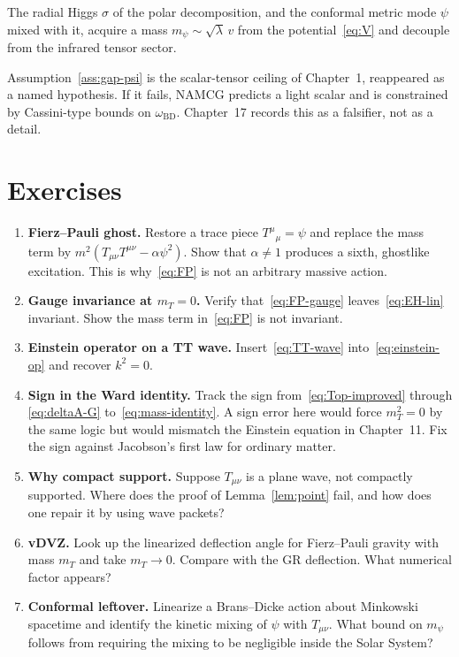 \begin{assumption}
  \label{ass:gap-psi}
  The radial Higgs \(\sigma\) of the polar decomposition, and the
  conformal metric mode \(\psi\) mixed with it, acquire a mass
  \(m_\psi\sim\sqrt{\lambda}\,v\) from the potential~\eqref{eq:V}
  and decouple from the infrared tensor sector.
\end{assumption}

Assumption~\ref{ass:gap-psi} is the scalar-tensor ceiling of
Chapter~1, reappeared as a named hypothesis. If it fails, NAMCG
predicts a light scalar and is constrained by Cassini-type bounds
on \(\omega_{\mathrm{BD}}\). Chapter~17 records this as a
falsifier, not as a detail.

\section{Exercises}
\label{sec:ch7-exercises}

\begin{enumerate}
  \item \textbf{Fierz--Pauli ghost.}
    Restore a trace piece \(T^\mu{}_\mu=\psi\) and replace the mass
    term by \(m^2(T_{\mu\nu}T^{\mu\nu}-\alpha\psi^2)\). Show that
    \(\alpha\neq 1\) produces a sixth, ghostlike excitation.
    This is why~\eqref{eq:FP} is not an arbitrary massive action.
  \item \textbf{Gauge invariance at \(m_T=0\).}
    Verify that~\eqref{eq:FP-gauge} leaves~\eqref{eq:EH-lin}
    invariant. Show the mass term in~\eqref{eq:FP} is not
    invariant.
  \item \textbf{Einstein operator on a TT wave.}
    Insert~\eqref{eq:TT-wave} into~\eqref{eq:einstein-op} and
    recover \(k^2=0\).
  \item \textbf{Sign in the Ward identity.}
    Track the sign from~\eqref{eq:Top-improved} through
    \eqref{eq:deltaA-G} to~\eqref{eq:mass-identity}. A sign error
    here would force \(m_T^2=0\) by the same logic but would
    mismatch the Einstein equation in Chapter~11. Fix the sign
    against Jacobson's first law for ordinary matter.
  \item \textbf{Why compact support.}
    Suppose \(T_{\mu\nu}\) is a plane wave, not compactly supported.
    Where does the proof of Lemma~\ref{lem:point} fail, and how
    does one repair it by using wave packets?
  \item \textbf{vDVZ.}
    Look up the linearized deflection angle for Fierz--Pauli
    gravity with mass \(m_T\) and take \(m_T\to 0\). Compare with
    the GR deflection. What numerical factor appears?
  \item \textbf{Conformal leftover.}
    Linearize a Brans--Dicke action about Minkowski spacetime and
    identify the kinetic mixing of \(\psi\) with \(T_{\mu\nu}\).
    What bound on \(m_\psi\) follows from requiring the mixing to
    be negligible inside the Solar System?
\end{enumerate}

